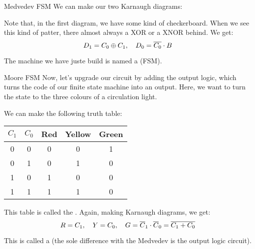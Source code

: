 \documentclass[a4paper]{article}
\begin{document}
\begin{parag}{Medvedev FSM}
    We can make our two Karnaugh diagrams:

    Note that, in the first diagram, we have some kind of checkerboard. When we see this kind of patter, there almost always a XOR or a XNOR behind. We get:
    \[D_1 = C_0 \oplus C_1, \quad D_0 = \overline{C_0} \cdot B\]

    The machine we have juste build is named a  (FSM).
\end{parag}

\begin{parag}{Moore FSM}
    Now, let's upgrade our circuit by adding the output logic, which turns the code of our finite state machine into an output. Here, we want to turn the state to the three colours of a circulation light. 


    We can make the following truth table:
    \begin{center}
    \begin{tabular}{cc|ccc}
        $C_1$ & $C_0$ & Red & Yellow & Green \\
        \hline
        0 & 0 & 0 & 0 & 1 \\
        0 & 1 & 0 & 1 & 0 \\
        1 & 0 & 1 & 0 & 0 \\
        1 & 1 & 1 & 1 & 0
    \end{tabular}
    \end{center}

    This table is called the . Again, making Karnaugh diagrams, we get: 
    \[R = C_1, \quad Y = C_0, \quad G = \overline{C}_1 \cdot \overline{C}_0 = \overline{C_1 + C_0}\]
    
    This is called a  (the sole difference with the Medvedev is the output logic circuit). 
\end{parag}
\end{document}

